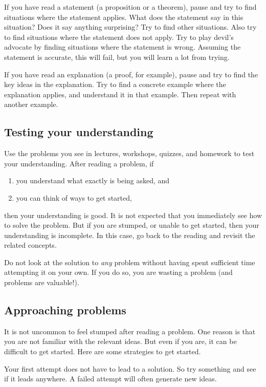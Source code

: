 \documentclass{amsart}
\begin{document}
If you have read a statement (a proposition or a theorem), pause and try to find situations where the statement applies.
What does the statement say in this situation?
Does it say anything surprising?
Try to find other situations.
Also try to find situations where the statement does not apply.
Try to play devil's advocate by finding situations where the statement is wrong.
Assuming the statement is accurate, this will fail, but you will learn a lot from trying.

If you have read an explanation (a proof, for example), pause and try to find the key ideas in the explanation.
Try to find a concrete example where the explanation applies, and understand it in that example.
Then repeat with another example.
\subsection{Testing your understanding}
\label{sec:org4720a86}

Use the problems you see in lectures, workshops, quizzes, and homework to test your understanding.
After reading a problem, if
\begin{enumerate}
\item you understand what exactly is being asked, and
\item you can think of ways to get started,
\end{enumerate}
then your understanding is good.  
It is not expected that you immediately see how to solve the problem.
But if you are stumped, or unable to get started, then your understanding is incomplete.
In this case, go back to the reading and revisit the related concepts.

Do not look at the solution to \emph{any} problem without having spent sufficient time attempting it on your own.
If you do so, you are wasting a problem (and problems are valuable!).
\subsection{Approaching problems}
\label{sec:orge32ab4e}

It is not uncommon to feel stumped after reading a problem.
One reason is that you are not familiar with the relevant ideas.
But even if you are, it can be difficult to get started.
Here are some strategies to get started.

Your first attempt does not have to lead to a solution.
So try something and see if it leads anywhere.
A failed attempt will often generate new ideas.
\end{document}
